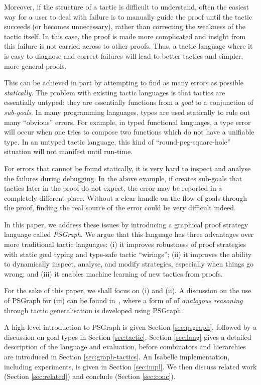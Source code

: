 \documentclass{llncs}
\begin{document}
Moreover, if the structure of a tactic is difficult to understand, often the easiest way for a user to
deal with failure is to manually guide the proof until the tactic succeeds (or becomes unnecessary), rather
than correcting the weakness of the tactic itself. In this case, the proof is made more complicated and
insight from this failure is not carried across to other proofs. Thus, a tactic language where it is easy
to diagnose and correct failures will lead to better tactics and simpler, more general proofs.

This can be achieved in part by attempting to find as many errors as possible \textit{statically}. The problem with
existing tactic languages is that tactics are essentially untyped: they are essentially functions from a \emph{goal} to
a conjunction of \emph{sub-goals}. In many programming languages, types are used statically to rule out many ``obvious''
errors. For example, in typed functional languages, a type error will occur when one tries to compose two functions
which do not have a unifiable type. In an untyped tactic language, this kind of ``round-peg-square-hole'' situation will
not manifest until run-time.

For errors that cannot be found statically, it is very hard to inspect and analyse the failures during debugging. In the
above example, if  creates sub-goals that tactics  later in the proof do not expect, the error may be reported in a
completely different place. Without a clear handle on the flow of goals through the proof, finding the real source of
the error could be very difficult indeed.

In this paper, we address these issues by introducing a graphical proof strategy language called \emph{PSGraph}. We
argue that this language has three advantages over more traditional tactic languages: (i) it improves robustness of
proof strategies with static goal typing and type-safe tactic ``wirings''; (ii) it improves the ability to dynamically
inspect, analyse, and modify strategies, especially when things go wrong; and (iii) it enables machine learning of new tactics
from proofs.

For the sake of this paper, we shall focus on (i) and (ii). A discussion on the use of PSGraph for (iii) can be found
in~\cite{grov13a}, where a form of of \textit{analogous reasoning} through tactic generalisation is developed using
PSGraph.


A high-level introduction to PSGraph is given Section \ref{sec:psgraph}, followed by a discussion on goal types in Section \ref{sec:tactic}. Section \ref{sec:lang} gives a detailed description of the language and evaluation, before combinators and hierarchies are introduced in Section \ref{sec:graph-tactics}. An Isabelle implementation, including experiments, is given in Section \ref{sec:impl}. We then discuss related work (Section \ref{sec:related}) and conclude (Section \ref{sec:conc}).
\end{document}
